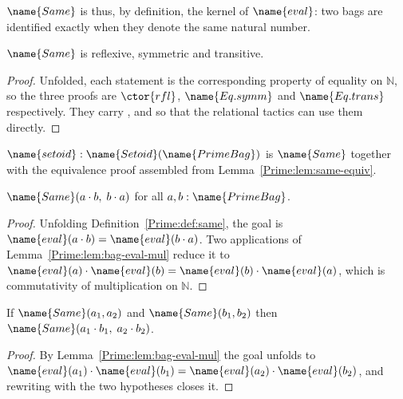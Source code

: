 $\name{Same}$ is thus, by definition, the kernel of $\name{eval}$: two bags
are identified exactly when they denote the same natural number.

\begin{lemma}
\label{Prime:lem:same-equiv}
$\name{Same}$ is reflexive, symmetric and transitive.
\end{lemma}

\begin{proof}
Unfolded, each statement is the corresponding property of equality on
$\mathbb{N}$, so the three proofs are $\ctor{rfl}$, $\name{Eq.symm}$ and
$\name{Eq.trans}$ respectively.  They carry ,  and
 so that the relational tactics can use them directly.
\end{proof}

\begin{definition}
\label{Prime:def:setoid}
$\name{setoid} : \name{Setoid}(\name{PrimeBag})$ is $\name{Same}$ together
with the equivalence proof assembled from Lemma~\ref{Prime:lem:same-equiv}.
\end{definition}

\begin{lemma}\label{Prime:lem:mul-comm-same}
$\name{Same}(a \cdot b,\; b \cdot a)$ for all $a, b : \name{PrimeBag}$.
\end{lemma}

\begin{proof}
Unfolding Definition~\ref{Prime:def:same}, the goal is
$\name{eval}(a \cdot b) = \name{eval}(b \cdot a)$.  Two applications of
Lemma~\ref{Prime:lem:bag-eval-mul} reduce it to
$\name{eval}(a) \cdot \name{eval}(b) = \name{eval}(b) \cdot \name{eval}(a)$,
which is commutativity of multiplication on $\mathbb{N}$.
\end{proof}

\begin{lemma}\label{Prime:lem:mul-same}
If $\name{Same}(a_1, a_2)$ and $\name{Same}(b_1, b_2)$ then
$\name{Same}(a_1 \cdot b_1,\; a_2 \cdot b_2)$.
\end{lemma}

\begin{proof}
By Lemma~\ref{Prime:lem:bag-eval-mul} the goal unfolds to
$\name{eval}(a_1) \cdot \name{eval}(b_1)
  = \name{eval}(a_2) \cdot \name{eval}(b_2)$,
and rewriting with the two hypotheses closes it.
\end{proof}

